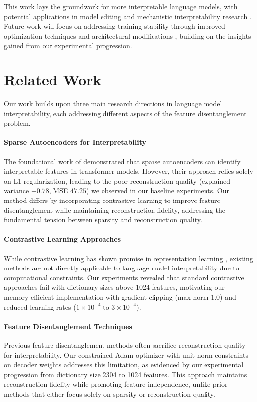 \documentclass{article} %
\begin{document}
This work lays the groundwork for more interpretable language models, with potential applications in model editing and mechanistic interpretability research \cite{radford2019language}. Future work will focus on addressing training stability through improved optimization techniques \cite{kingma2014adam} and architectural modifications \cite{ba2016layer}, building on the insights gained from our experimental progression.

\section{Related Work}
\label{sec:related}

Our work builds upon three main research directions in language model interpretability, each addressing different aspects of the feature disentanglement problem.

\paragraph{Sparse Autoencoders for Interpretability} The foundational work of \cite{Cunningham2023SparseAF} demonstrated that sparse autoencoders can identify interpretable features in transformer models. However, their approach relies solely on L1 regularization, leading to the poor reconstruction quality (explained variance $-0.78$, MSE $47.25$) we observed in our baseline experiments. Our method differs by incorporating contrastive learning to improve feature disentanglement while maintaining reconstruction fidelity, addressing the fundamental tension between sparsity and reconstruction quality.

\paragraph{Contrastive Learning Approaches} While contrastive learning has shown promise in representation learning \cite{goodfellow2016deep}, existing methods are not directly applicable to language model interpretability due to computational constraints. Our experiments revealed that standard contrastive approaches fail with dictionary sizes above 1024 features, motivating our memory-efficient implementation with gradient clipping (max norm $1.0$) and reduced learning rates ($1\times10^{-4}$ to $3\times10^{-4}$).

\paragraph{Feature Disentanglement Techniques} Previous feature disentanglement methods often sacrifice reconstruction quality for interpretability. Our constrained Adam optimizer with unit norm constraints on decoder weights addresses this limitation, as evidenced by our experimental progression from dictionary size 2304 to 1024 features. This approach maintains reconstruction fidelity while promoting feature independence, unlike prior methods that either focus solely on sparsity or reconstruction quality.
\end{document}
